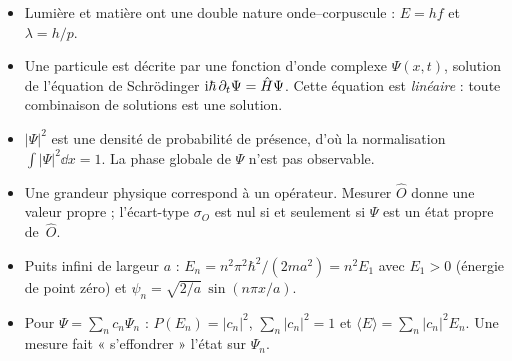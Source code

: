 \begin{aretenir}
\begin{itemize}
  \item Lumière et matière ont une double nature onde--corpuscule : $E=hf$ et $\lambda=h/p$.
  \item Une particule est décrite par une fonction d'onde complexe $\Psi(x,t)$, solution de
        l'équation de Schrödinger $\mathrm{i}\hbar\,\partial_t\Psi=\hat{H}\Psi$. Cette équation est
        \emph{linéaire} : toute combinaison de solutions est une solution.
  \item $|\Psi|^2$ est une densité de probabilité de présence, d'où la normalisation
        $\int|\Psi|^2\dd x=1$. La phase globale de $\Psi$ n'est pas observable.
  \item Une grandeur physique correspond à un opérateur. Mesurer $\hat O$ donne une valeur
        propre ; l'écart-type $\sigma_O$ est nul si et seulement si $\Psi$ est un état propre de~$\hat O$.
  \item Puits infini de largeur $a$ : $E_n=n^2\pi^2\hbar^2/(2ma^2)=n^2E_1$ avec $E_1>0$ (énergie
        de point zéro) et $\psi_n=\sqrt{2/a}\,\sin(n\pi x/a)$.
  \item Pour $\Psi=\sum_n c_n\Psi_n$ : $P(E_n)=|c_n|^2$, $\sum_n|c_n|^2=1$ et
        $\langle E\rangle=\sum_n|c_n|^2E_n$. Une mesure fait « s'effondrer » l'état sur $\Psi_n$.
\end{itemize}
\end{aretenir}

